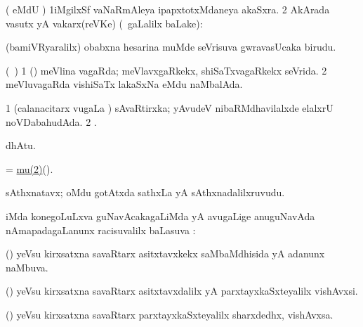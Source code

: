 \bentry
{}
\gl{\nA}
\bmng
( eMdU \parx) 
\bnum
\num{1}iMgilxSf vaNaRmAleya ipapxtotxMdaneya akaSxra. 
\num{2}  AkArada vasutx yA vakarx(reVKe) (\kanmu\ \saMpa gaLalilx baLake):  
\enum
\emng
\eentry

\bentry
{} 
\gl{\nA}
\expl{}
\bmng
(bamiVRyaralilx) obabxna hesarina muMde seVrisuva gwravasUcaka birudu. 
\emng
\eentry

\bentry
{} 
\gl{\gu}
\expl{}
\bmng
(\kanmu\ \birx) 
\bnum
\num{1} (\AmA) meVlina vagaRda; meVlavxgaRkekx, shiSaTxvagaRkekx seVrida. 
\num{2} meVluvagaRda vishiSaTx lakaSxNa eMdu naMbalAda. 
\enum
\emng
\eentry

\bentry
{} 
\gl{\saMkiSx}
\expl{}
\bmng
\bnum
\num{1} (calanacitarx \mo vugaLa \vi)  sAvaRtirxka; yAvudeV nibaRMdhavilalxde elalxrU noVDabahudAda. 
\num{2} . 
\enum
\emng
\eentry

\bentry
{} 
\gl{\saMkeV}
\expl{(\ravi) }
\bmng
{} dhAtu. 
\emng
\eentry

\bentry
{}
\gl{\pUparx}
\expl{}
\bmng
= \hyperref{kandict_m.pdf}{M}{mu(2)}{mu(2)}(\eng{$\mu$}). 
\emng
\eentry

\bentry
{}
\gl{\saMkiSx}
\expl{}
\bmng
{} 
\emng
\eentry

\bentry
{} 
\gl{\nA}
\expl{}
\bmng
sAthxnatavx; oMdu gotAtxda sathxLa yA sAthxnadalilxruvudu. 
\emng
\eentry

\bentry
{}
\gl{\uparx}
\expl{}
\bmng
{} iMda konegoLuLxva guNavAcakagaLiMda yA avugaLige anuguNavAda nAmapadagaLanunx racisuvalilx baLasuva \uparx:  
\emng
\eentry

\bentry
{} 
\gl{\gu}
\expl{}
\bmng
(\deVva) yeVsu kirxsatxna savaRtarx asitxtavxkekx saMbaMdhisida yA adanunx naMbuva. 
\emng
\eentry

\bentry
{} 
\gl{\nA}
\expl{}
\bmng
(\deVva) yeVsu kirxsatxna savaRtarx asitxtavxdalilx yA parxtayxkaSxteyalilx vishAvxsi. 
\emng
\eentry

\bentry
{} 
\gl{\nA}
\expl{}
\bmng
(\deVva) yeVsu kirxsatxna savaRtarx parxtayxkaSxteyalilx sharxdedhx, vishAvxsa. 
\emng
\eentry

